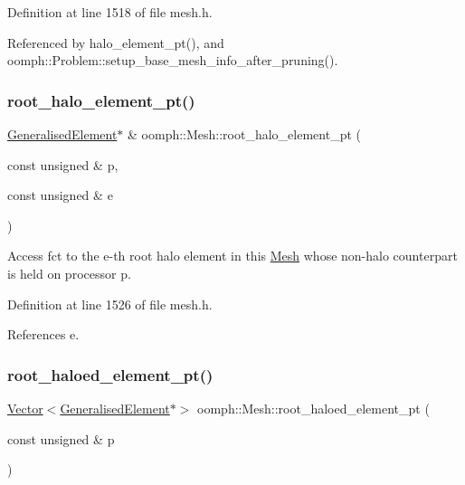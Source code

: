 Definition at line 1518 of file mesh.\+h.



Referenced by halo\+\_\+element\+\_\+pt(), and oomph\+::\+Problem\+::setup\+\_\+base\+\_\+mesh\+\_\+info\+\_\+after\+\_\+pruning().

\mbox{\label{classoomph_1_1Mesh_a4f590ac09a00fbaae856c8f812fc2001}} 
\subsubsection{\texorpdfstring{root\+\_\+halo\+\_\+element\+\_\+pt()}{root\_halo\_element\_pt()}\hspace{0.1cm}{\footnotesize\ttfamily [2/2]}}
{\footnotesize\ttfamily \hyperlink{classoomph_1_1GeneralisedElement}{Generalised\+Element}$\ast$ \& oomph\+::\+Mesh\+::root\+\_\+halo\+\_\+element\+\_\+pt (\begin{DoxyParamCaption}\item[{const unsigned \&}]{p,  }\item[{const unsigned \&}]{e }\end{DoxyParamCaption})\hspace{0.3cm}{\ttfamily [inline]}}



Access fct to the e-\/th root halo element in this \hyperlink{classoomph_1_1Mesh}{Mesh} whose non-\/halo counterpart is held on processor p. 



Definition at line 1526 of file mesh.\+h.



References e.

\mbox{\label{classoomph_1_1Mesh_aec21d977c62086890f0ebc8dbc173afe}} 
\subsubsection{\texorpdfstring{root\+\_\+haloed\+\_\+element\+\_\+pt()}{root\_haloed\_element\_pt()}\hspace{0.1cm}{\footnotesize\ttfamily [1/2]}}
{\footnotesize\ttfamily \hyperlink{classoomph_1_1Vector}{Vector}$<$\hyperlink{classoomph_1_1GeneralisedElement}{Generalised\+Element}$\ast$$>$ oomph\+::\+Mesh\+::root\+\_\+haloed\+\_\+element\+\_\+pt (\begin{DoxyParamCaption}\item[{const unsigned \&}]{p }\end{DoxyParamCaption})\hspace{0.3cm}{\ttfamily [inline]}}



